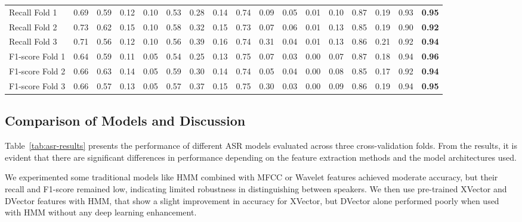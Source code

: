 \documentclass[conference]{IEEEtran}
\begin{document}
\begin{table*}[htbp]
{\begin{tabular}{|l|c|c|c|c|c|c|c|c|c|c|c|c|c|c|c|c|}
            \hline
            Recall Fold 1          & 0.69     & 0.59     & 0.12        & 0.10     & 0.53     & 0.28     & 0.14        & 0.74     & 0.09      & 0.05         & 0.01      & 0.10      & 0.87          & 0.19             & 0.93          & \textbf{0.95}          \\
            Recall Fold 2          & 0.73     & 0.62     & 0.15        & 0.10     & 0.58     & 0.32     & 0.15        & 0.73     & 0.07      & 0.06         & 0.01      & 0.13      & 0.85          & 0.19             & 0.90          & \textbf{0.92}          \\
            Recall Fold 3          & 0.71     & 0.56     & 0.12        & 0.10     & 0.56     & 0.39     & 0.16        & 0.74     & 0.31      & 0.04         & 0.01      & 0.13      & 0.86          & 0.21             & 0.92          & \textbf{0.94}          \\
            F1-score Fold 1        & 0.64     & 0.59     & 0.11        & 0.05     & 0.54     & 0.25     & 0.13        & 0.75     & 0.07      & 0.03         & 0.00      & 0.07      & 0.87          & 0.18             & 0.94          & \textbf{0.96}          \\
            F1-score Fold 2        & 0.66     & 0.63     & 0.14        & 0.05     & 0.59     & 0.30     & 0.14        & 0.74     & 0.05      & 0.04         & 0.00      & 0.08      & 0.85          & 0.17             & 0.92          & \textbf{0.94}          \\
            F1-score Fold 3        & 0.66     & 0.57     & 0.13        & 0.05     & 0.57     & 0.37     & 0.15        & 0.75     & 0.30      & 0.03         & 0.00      & 0.09      & 0.86          & 0.19             & 0.94          & \textbf{0.95}          \\
            \hline
        \end{tabular}
    }
\end{table*}
\subsection{Comparison of Models and Discussion}

Table~\ref{tab:asr-results} presents the performance of different ASR models evaluated across three cross-validation folds. From the results, it is evident that there are significant differences in performance depending on the feature extraction methods and the model architectures used.

We experimented some traditional models like HMM combined with MFCC or Wavelet features achieved moderate accuracy, but their recall and F1-score remained low, indicating limited robustness in distinguishing between speakers. We then use pre-trained XVector and DVector features with HMM, that show a slight improvement in accuracy for XVector, but DVector alone performed poorly when used with HMM without any deep learning enhancement.
\end{document}
